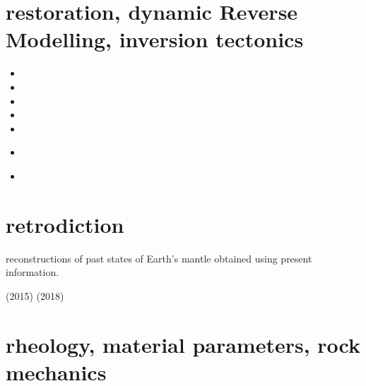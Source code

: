 \section{restoration, dynamic Reverse Modelling, inversion tectonics}

\begin{small}
\begin{itemize}
\item[\twothousandone] 
\item[\twothousandfour] 
\item[\twothousandfive] 
\item[\twothousandtwelve] 
\item[\twothousandeighteen] 
\item[\twothousandtwenty] 
 \\
\item[\twothousandtwentyfour] 
\end{itemize}
\end{small}


\section{retrodiction}
reconstructions of past states of Earth's mantle obtained using present information.

\textcite{cobs15} (2015)
\textcite{cogb18} (2018)
\textcite{ghbo21} 


\section{rheology, material parameters, rock mechanics}

